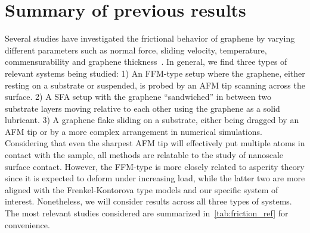 \section{Summary of previous results}\label{sec:prev_results}
Several studies have investigated the frictional behavior of graphene by varying
different parameters such as normal force, sliding velocity, temperature,
commensurability and graphene thickness~\cite{penkov_tribology_2014}. In
general, we find three types of relevant systems being studied: 1) An
\acrshort{FFM}-type setup where the graphene, either resting on a substrate or
suspended, is probed by an \acrshort{AFM} tip scanning across the surface. 2) A
\acrshort{SFA} setup with the graphene ``sandwiched'' in between two substrate
layers moving relative to each other using the graphene as a solid lubricant. 3)
A graphene flake sliding on a substrate, either being dragged by an
\acrshort{AFM} tip or by a more complex arrangement in numerical simulations.
Considering that even the sharpest \acrshort{AFM} tip will effectively put
multiple atoms in contact with the sample, all methods are relatable to the
study of nanoscale surface contact. However, the \acrshort{FFM}-type is more
closely related to asperity theory since it is expected to deform under
increasing load, while the latter two are more aligned with the
Frenkel-Kontorova type models and our specific system of interest. Nonetheless,
we will consider results across all three types of systems. The most relevant studies considered are summarized in~\cref{tab:friction_ref} for convenience. 


